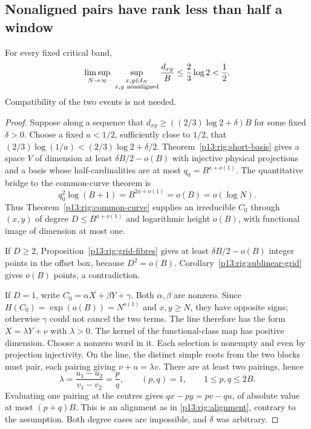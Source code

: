 \subsection{Nonaligned pairs have rank less than half a window}

\begin{theorem}
\label{p13:rig:nonaligned}
For every fixed critical band,
\begin{equation}
 \limsup_{N\to\infty}\ 
 \sup_{\substack{x,y\in I_N\\x,y\ {\rm nonaligned}}}
             \frac{d_{xy}}B
       \le\frac23\log2<\frac12.
 \label{p13:rig:nonaligned-bound}
\end{equation}
Compatibility of the two events is not needed.
\end{theorem}

\begin{proof}
Suppose along a sequence that
$d_{xy}\ge((2/3)\log2+\delta)B$ for some fixed
$\delta>0$.  Choose a fixed $a<1/2$, sufficiently close to
$1/2$, that
$(2/3)\log(1/a)<(2/3)\log2+\delta/2$.
Theorem~\ref{p13:rig:short-basis} gives a space $V$
of dimension at least $\delta B/2-o(B)$ with injective
physical projections and a basis whose half-cardinalities
are at most $q_0=B^{a+o(1)}$.  The quantitative bridge to
the common-curve theorem is
\begin{equation}
              q_0^2\log(B+1)=B^{2a+o(1)}=o(B)=o(\log N).
 \label{p13:rig:threshold-bridge}
\end{equation}
Thus Theorem~\ref{p13:rig:common-curve} supplies an
irreducible $C_0$ through $(x,y)$ of degree
$D\le B^{a+o(1)}$ and logarithmic height $o(B)$, with
functional image of dimension at most one.

If $D\ge2$, Proposition~\ref{p13:rig:grid-fibres} gives
at least $\delta B/2-o(B)$ integer points in the offset
box, because $D^2=o(B)$.  Corollary~\ref{p13:rig:sublinear-grid}
gives $o(B)$ points, a contradiction.

If $D=1$, write $C_0=\alpha X+\beta Y+\gamma$.
Both $\alpha,\beta$ are nonzero.  Since
$H(C_0)=\exp(o(B))=N^{o(1)}$ and $x,y\ge N$, they have
opposite signs; otherwise $\gamma$ could not cancel the
two terms.  The line therefore has the form
$X=\lambda Y+\nu$ with $\lambda>0$.
The kernel of the functional-class map has positive
dimension.  Choose a nonzero word in it.  Each selection
is nonempty and even by projection injectivity.  On the
line, the distinct simple roots from the two blocks must
pair, each pairing giving $\nu+u=\lambda v$.
There are at least two pairings, hence
\[
 \lambda=\frac{u_1-u_2}{v_1-v_2}=\frac pq,
 \qquad (p,q)=1,\qquad 1\le p,q\le2B.
\]
Evaluating one pairing at the centres gives
$qx-py=pv-qu$, of absolute value at most $(p+q)B$.
This is an alignment as in \eqref{p13:rig:alignment},
contrary to the assumption.  Both degree cases are
impossible, and $\delta$ was arbitrary.
\end{proof}

